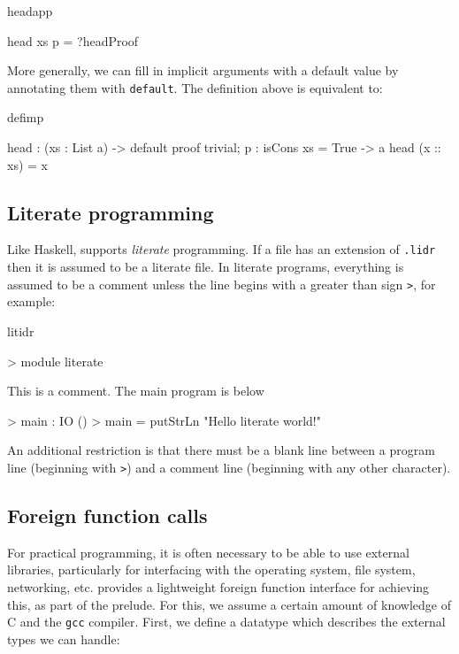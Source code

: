 \begin{SaveVerbatim}{headapp}

head xs {p = ?headProof} 

\end{SaveVerbatim}

\noindent
More generally, we can fill in implicit arguments with a default value by annotating
them with \texttt{default}. The definition above is equivalent to:

\begin{SaveVerbatim}{defimp}

head : (xs : List a) -> 
       {default proof { trivial; } p : isCons xs = True} -> a
head (x :: xs) = x

\end{SaveVerbatim}

\subsection{Literate programming}

Like Haskell, \Idris{} supports \emph{literate} programming. If a file has an
extension of \texttt{.lidr} then it is assumed to be a literate file. In literate
programs, everything is assumed to be a comment unless the line begins with a
greater than sign \texttt{>}, for example:

\begin{SaveVerbatim}{litidr}

> module literate

This is a comment. The main program is below

> main : IO ()
> main = putStrLn "Hello literate world!\n"

\end{SaveVerbatim}

\noindent
An additional restriction is that there must be a blank line between a program
line (beginning with \texttt{>}) and a comment line (beginning with any other
character).

\subsection{Foreign function calls}

For practical programming, it is often necessary to be able to use external libraries,
particularly for interfacing with the operating system, file system, networking, etc.
\Idris{} provides a lightweight foreign function interface for achieving this,
as part of the prelude. For this, we assume a certain amount of knowledge of
C and the \texttt{gcc} compiler. First, we define a datatype which describes the external
types we can handle:

